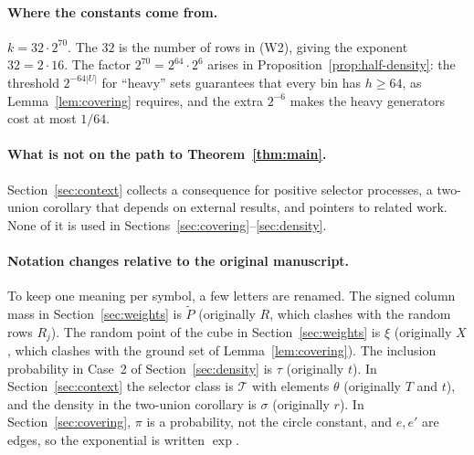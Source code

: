 \documentclass[11pt,letterpaper]{article}
\theoremstyle{definition}
\theoremstyle{remark}
\numberwithin{equation}{section}
\begin{document}
\begin{center}
\end{center}

\paragraph{Where the constants come from.}
$k=32\cdot2^{70}$. The $32$ is the number of rows in (W2), giving the
exponent $32=2\cdot16$. The factor $2^{70}=2^{64}\cdot2^{6}$ arises in
Proposition~\ref{prop:half-density}: the threshold $2^{-64|U|}$ for
``heavy'' sets guarantees that every bin has $h\ge64$, as
Lemma~\ref{lem:covering} requires, and the extra $2^{-6}$ makes the heavy
generators cost at most $1/64$.

\paragraph{What is not on the path to Theorem~\ref{thm:main}.}
Section~\ref{sec:context} collects a consequence for positive selector
processes, a two-union corollary that depends on external results, and
pointers to related work. None of it is used in
Sections~\ref{sec:covering}--\ref{sec:density}.

\paragraph{Notation changes relative to the original manuscript.}
To keep one meaning per symbol, a few letters are renamed. The signed
column mass in Section~\ref{sec:weights} is $\widetilde P$ (originally
$R$, which clashes with the random rows $R_j$). The random point of the
cube in Section~\ref{sec:weights} is $\xi$ (originally $X$, which clashes
with the ground set of Lemma~\ref{lem:covering}). The inclusion
probability in Case~2 of Section~\ref{sec:density} is $\tau$
(originally $t$). In Section~\ref{sec:context} the selector class is
$\mathcal T$ with elements $\theta$ (originally $T$ and $t$), and the
density in the two-union corollary is $\sigma$ (originally $r$).
In Section~\ref{sec:covering}, $\pi$ is a probability, not the circle
constant, and $e,e'$ are edges, so the exponential is written $\exp$.
\end{document}
